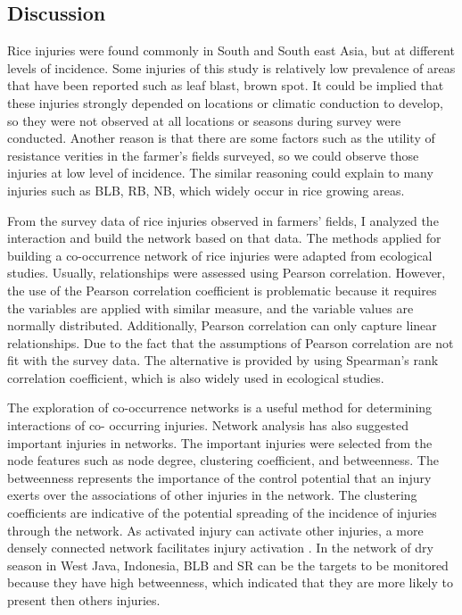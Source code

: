 \subsection{Discussion}

Rice injuries were found commonly in South and South east Asia, but at different levels of incidence. 
Some injuries of this study is relatively low prevalence of areas that have been reported such as leaf blast, brown spot. It could be implied that these injuries strongly depended on locations or climatic conduction to develop, so they were not observed at all locations or seasons during survey were conducted. Another reason is that there are some factors such as the utility of resistance verities in the farmer’s fields surveyed, so we could observe those injuries at low level of incidence. The similar reasoning could explain to many injuries such as BLB, RB, NB, which widely occur in rice growing areas.

From the survey data of rice injuries observed in farmers’ fields, I analyzed the interaction and build the network based on that data. The methods applied for building a co-occurrence network of rice injuries were adapted from ecological studies. Usually, relationships were assessed using Pearson correlation. However, the use of the Pearson correlation coefficient is problematic because it requires the variables are applied with similar measure, and the variable values are normally distributed. Additionally, Pearson correlation can only capture linear relationships. Due to the fact that the assumptions of Pearson correlation are not fit with the survey data. The alternative is provided by using Spearman’s rank correlation coefficient, which is also widely used in ecological studies.

The exploration of co-occurrence networks is a useful method for determining interactions of co- occurring injuries. Network analysis has also suggested important injuries in networks. The important injuries were selected from the node features such as node degree, clustering coefficient, and betweenness. The betweenness represents the importance of the control potential that an injury exerts over the associations of other injuries in the network. The clustering coefficients are indicative of the potential spreading of the incidence of injuries through the network. As activated injury can activate other injuries, a more densely connected network facilitates injury activation \cite{Williams_2014_demonstrating}. In the network of dry season in West Java, Indonesia, BLB and SR can be the targets to be monitored because they have high betweenness, which indicated that they are more likely to present then others injuries.

